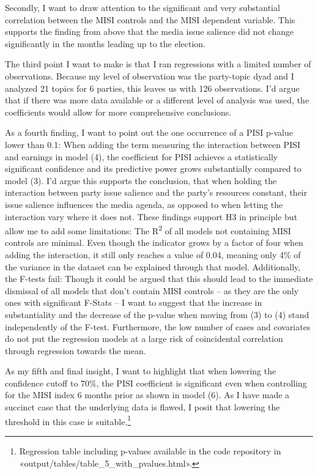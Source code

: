 \documentclass[11pt,a4paper]{article}
\begin{document}
Secondly, I want to draw attention to the significant and very substantial correlation between the MISI controls and the MISI dependent variable. This supports the finding from above that the media issue salience did not change significantly in the months leading up to the election.

The third point I want to make is that I ran regressions with a limited number of observations. Because my level of observation was the party-topic dyad and I analyzed 21 topics for 6 parties, this leaves us with 126 observations. I’d argue that if there was more data available or a different level of analysis was used, the coefficients would allow for more comprehensive conclusions.

As a fourth finding, I want to point out the one occurrence of a PISI p-value lower than 0.1: When adding the term measuring the interaction between PISI and earnings in model (4), the coefficient for PISI achieves a statistically significant confidence and its predictive power grows substantially compared to model (3). I’d argue this supports the conclusion, that when holding the interaction between party issue salience and the party’s resources constant, their issue salience influences the media agenda, as opposed to when letting the interaction vary where it does not. These findings support H3 in principle but allow me to add some limitations: The R\textsuperscript{2} of all models not containing MISI controls are minimal. Even though the indicator grows by a factor of four when adding the interaction, it still only reaches a value of 0.04, meaning only 4\% of the variance in the dataset can be explained through that model. Additionally, the F-tests fail: Though it could be argued that this should lead to the immediate dismissal of all models that don’t contain MISI controls – as they are the only ones with significant F-Stats – I want to suggest that the increase in substantiality and the decrease of the p-value when moving from (3) to (4) stand independently of the F-test. Furthermore, the low number of cases and covariates do not put the regression models at a large risk of coincidental correlation through regression towards the mean.

As my fifth and final insight, I want to highlight that when lowering the confidence cutoff to 70\%, the PISI coefficient is significant even when controlling for the MISI index 6 months prior as shown in model (6). As I have made a succinct case that the underlying data is flawed, I posit that lowering the threshold in this case is suitable.\footnote{Regression table including p-values available in the code repository in «output/tables/table\_5\_with\_pvalues.html».}
\end{document}
